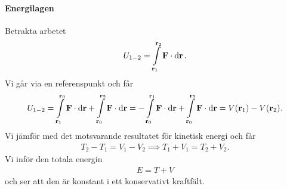 \paragraph{Energilagen}
Betrakta arbetet
\begin{align*}
	U_{1 - 2} = \int\limits_{\vb{r}_1}^{\vb{r}_2}\vb{\vb{F}}\cdot\dd{\vb{r}}.
\end{align*}
Vi går via en referenspunkt och får
\begin{align*}
	U_{1 - 2} = \int\limits_{\vb{r}_1}^{\vb{r}_0}\vb{\vb{F}}\cdot\dd{\vb{r}} + \int\limits_{\vb{r}_0}^{\vb{r}_2}\vb{\vb{F}}\cdot\dd{\vb{r}} = -\int\limits_{\vb{r}_0}^{\vb{r}_1}\vb{\vb{F}}\cdot\dd{\vb{r}} + \int\limits_{\vb{r}_0}^{\vb{r}_2}\vb{\vb{F}}\cdot\dd{\vb{r}} = V(\vb{r}_1) - V(\vb{r}_2).
\end{align*}
Vi jämför med det motsvarande resultatet för kinetisk energi och får
\begin{align*}
	T_2 - T_1 = V_1 - V_2\implies T_1 + V_1 = T_2 + V_2.
\end{align*}
Vi inför den totala energin
\begin{align*}
	E = T + V
\end{align*}
och ser att den är konstant i ett konservativt kraftfält.